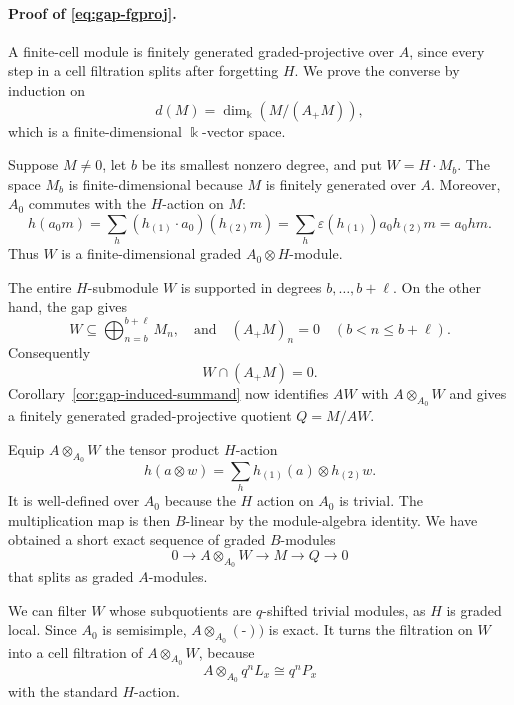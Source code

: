 \documentclass[11pt]{article}
\theoremstyle{definition}
\numberwithin{equation}{section}
\newcommand{\kk}{\Bbbk}
\begin{document}
\paragraph{Proof of \eqref{eq:gap-fgproj}.} 
 A finite-cell module is finitely generated graded-projective over $A$,
since every step in a cell filtration splits after forgetting $H$.
We prove the converse by induction on
\[
 d(M)=\dim_\kk(M/(A_+M)),
\]
which is a finite-dimensional $\Bbbk$-vector space.


Suppose $M\ne 0$, let $b$ be its smallest nonzero degree, and put
$ W=H\cdot M_b $.
The space $M_b$ is finite-dimensional because $M$ is finitely generated over $A$.
Moreover, $A_0$ commutes with the $H$-action on $M$:
\begin{equation}\label{eq:gap-A0-commutes}
 h(a_0m)=\sum_{h}(h_{(1)}\cdot a_0)(h_{(2)}m)
 =\sum_{h}\varepsilon(h_{(1)})a_0h_{(2)}m=a_0hm.
\end{equation}
Thus $W$ is a finite-dimensional graded $A_0\otimes H$-module.

The entire $H$-submodule $W$ is supported in degrees
$b,\ldots,b+\ell$.  On the other hand, the gap gives
\begin{equation}\label{eq:gap-support-separation}
 W\subseteq\bigoplus_{n=b}^{b+\ell}M_n,\quad \textrm{and} \quad
 (A_+M)_n=0\quad(b< n\le b+\ell).
\end{equation}
Consequently
\begin{equation}\label{eq:gap-disjoint}
 W\cap (A_+M)=0.
\end{equation}
Corollary~\ref{cor:gap-induced-summand} now identifies $AW$ with
$A\otimes_{A_0}W$ and gives a finitely generated graded-projective
quotient $Q=M/AW$.


Equip $A\otimes_{A_0}W$ the tensor product $H$-action
\[
 h(a\otimes w)=\sum_{h}h_{(1)}(a)\otimes h_{(2)}w.
\]
It is well-defined over $A_0$ because the $H$ action on $A_0$ is trivial.
The multiplication map is then $B$-linear by the module-algebra identity.
We have obtained a short exact sequence of graded $B$-modules
\begin{equation}\label{eq:gap-peeling}
 0\longrightarrow A\otimes_{A_0}W
 \longrightarrow M\longrightarrow Q\longrightarrow0
\end{equation}
that splits as graded $A$-modules.  


We can filter $W$ whose subquotients are $q$-shifted trivial modules, as $H$ is graded local.
Since $A_0$ is semisimple,
$A\otimes_{A_0}(\mbox{-}))$ is exact.  It turns the filtration on $W$ into a cell
filtration of $A\otimes_{A_0}W$, because
\[
 A\otimes_{A_0}q^nL_x\cong q^nP_x
\]
with the standard $H$-action.  
\end{document}
